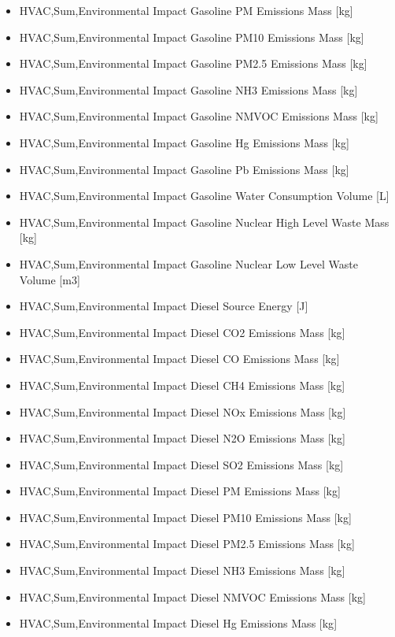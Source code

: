 \begin{itemize}
\item
  HVAC,Sum,Environmental Impact Gasoline PM Emissions Mass {[}kg{]}
\item
  HVAC,Sum,Environmental Impact Gasoline PM10 Emissions Mass {[}kg{]}
\item
  HVAC,Sum,Environmental Impact Gasoline PM2.5 Emissions Mass {[}kg{]}
\item
  HVAC,Sum,Environmental Impact Gasoline NH3 Emissions Mass {[}kg{]}
\item
  HVAC,Sum,Environmental Impact Gasoline NMVOC Emissions Mass {[}kg{]}
\item
  HVAC,Sum,Environmental Impact Gasoline Hg Emissions Mass {[}kg{]}
\item
  HVAC,Sum,Environmental Impact Gasoline Pb Emissions Mass {[}kg{]}
\item
  HVAC,Sum,Environmental Impact Gasoline Water Consumption Volume {[}L{]}
\item
  HVAC,Sum,Environmental Impact Gasoline Nuclear High Level Waste Mass {[}kg{]}
\item
  HVAC,Sum,Environmental Impact Gasoline Nuclear Low Level Waste Volume {[}m3{]}
\item
  HVAC,Sum,Environmental Impact Diesel Source Energy {[}J{]}
\item
  HVAC,Sum,Environmental Impact Diesel CO2 Emissions Mass {[}kg{]}
\item
  HVAC,Sum,Environmental Impact Diesel CO Emissions Mass {[}kg{]}
\item
  HVAC,Sum,Environmental Impact Diesel CH4 Emissions Mass {[}kg{]}
\item
  HVAC,Sum,Environmental Impact Diesel NOx Emissions Mass {[}kg{]}
\item
  HVAC,Sum,Environmental Impact Diesel N2O Emissions Mass {[}kg{]}
\item
  HVAC,Sum,Environmental Impact Diesel SO2 Emissions Mass {[}kg{]}
\item
  HVAC,Sum,Environmental Impact Diesel PM Emissions Mass {[}kg{]}
\item
  HVAC,Sum,Environmental Impact Diesel PM10 Emissions Mass {[}kg{]}
\item
  HVAC,Sum,Environmental Impact Diesel PM2.5 Emissions Mass {[}kg{]}
\item
  HVAC,Sum,Environmental Impact Diesel NH3 Emissions Mass {[}kg{]}
\item
  HVAC,Sum,Environmental Impact Diesel NMVOC Emissions Mass {[}kg{]}
\item
  HVAC,Sum,Environmental Impact Diesel Hg Emissions Mass {[}kg{]}

\end{itemize}

